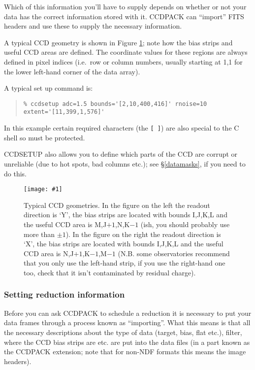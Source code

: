 \documentclass[twoside,11pt]{article}
\newcommand{\htmladdimg}[1]{}
\newcommand{\hyperref}[4]{#2\ref{#4}#3}
\newcommand{\htmlref}[2]{#1}
\renewcommand{\_}{\texttt{\symbol{95}}}
\newenvironment{myquote}{\begin{quote}\begin{small}}{\end{small}\end{quote}}
\newcommand{\text}[1]{{\small \tt #1}}
\newcommand{\xroutine}[1]{\htmlref{{\sc #1}}{#1}}
\newcommand{\myfig} [5] {
  \begin{figure}
    \centering\texttt{[image: \#1]}
    \typeout{#1 inserted on page \arabic{page}}
    \caption{\label{#4}#5}
  \end{figure}
  }
\newcommand{\myfig}[5]{
    \htmladdimg{#3}\\
    Figure: \label{#4} #5
    }
\begin{document}
Which of this information you'll have to supply depends on whether or
not your data has the correct information stored with it.
CCDPACK can ``import'' FITS headers and use these to supply the
necessary information.

A typical CCD geometry is shown in Figure \ref{CCDPICCY}; note how the
bias strips and useful CCD areas are defined. The coordinate values
for these regions are always defined in pixel indices (i.e.\ row or
column numbers, usually starting at 1,1 for the lower left-hand corner
of the data array).

A typical set up command is:
\begin{myquote}
\begin{verbatim}
% ccdsetup adc=1.5 bounds='[2,10,400,416]' rnoise=10 extent='[11,399,1,576]'
\end{verbatim}
\end{myquote}
In this example certain required characters (the \text{[ ]}) are also
special to the C shell so must be protected.

\xroutine{CCDSETUP} also allows you to define which parts of the CCD are
corrupt or unreliable (due to hot spots, bad columns etc.); see
\hyperref{the section on data-masks}{\S}{}{datamasks}, if you need to do this.

\myfig{sun139geo.eps}{}{geo.gif}{CCDPICCY}{Typical CCD geometries.
In the figure on the left the readout direction is `Y', the bias
strips are located with bounds I,J,K,L and the useful CCD area is
M,J$+1$,N,K$-1$ (ish, you should probably use more than $\pm 1$).  In
the figure on the right the readout direction is `X', the bias strips
are located with bounds I,J,K,L and the useful CCD area is
N,J$+1$,K$-1$,M$-1$ (N.B. some observatories recommend that you only
use the left-hand strip, if you use the right-hand one too, check that
it isn't contaminated by residual charge).}

\subsubsection{Setting reduction information \label{settingreductioninfo}}

Before you can ask CCDPACK to schedule a reduction it is necessary to
put your data frames through a process known as ``importing''. What
this means is that all the necessary descriptions about the type of
data (target, bias, flat etc.), filter, where the CCD bias strips are
etc. are put into the data files (in a part known as the CCDPACK
extension; note that for non-NDF formats this means the image
headers).
\end{document}
